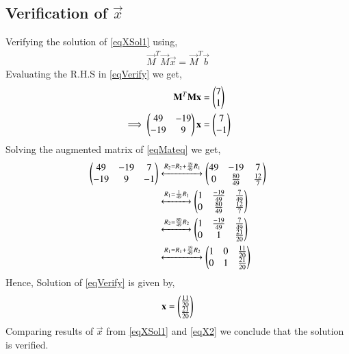 \documentclass[journal,12pt,twocolumn]{IEEEtran}
\begin{document}
\subsection{Verification of $\vec{x}$}

Verifying the solution of \eqref{eqXSol1} using,
\begin{align}
\vec{M}^T\vec{M}\vec{x} = \vec{M}^T\vec{b}\label{eqVerify}
\end{align}
Evaluating the R.H.S in \eqref{eqVerify} we get,
\begin{align}
\mathbf{M}^T\mathbf{M}\mathbf{x} &= \begin{pmatrix}7\\\-1\end{pmatrix}\\
\implies\begin{pmatrix}49&-19\\-19&9\end{pmatrix}\mathbf{x} &= \begin{pmatrix}7\\-1\end{pmatrix}\label{eqMateq}
\end{align}
Solving the augmented matrix of \eqref{eqMateq} we get,
\begin{align}
\begin{pmatrix}49&-19&7\\-19&9&-1\end{pmatrix} &\xleftrightarrow{R_2=R_2+\frac{19}{49}R_1}\begin{pmatrix}49&-19&7\\0&\frac{80}{49}&\frac{12}{7}\end{pmatrix}\\
&\xleftrightarrow{R_1=\frac{1}{49}R_1}\begin{pmatrix}1&\frac{-19}{49}&\frac{7}{49}\\0&\frac{80}{49}&\frac{12}{7}\end{pmatrix}\\
&\xleftrightarrow{R_2=\frac{80}{49}R_2}\begin{pmatrix}1&\frac{-19}{49}&\frac{7}{49}\\0&1&\frac{21}{20}\end{pmatrix}\\
&\xleftrightarrow{R_1=R_1+\frac{19}{49}R_2}\begin{pmatrix}1&0&\frac{11}{20}\\0&1&\frac{21}{20}\end{pmatrix}
\end{align}
Hence, Solution of \eqref{eqVerify} is given by,
\begin{align}
\mathbf{x}=\begin{pmatrix}\frac{11}{20}\\\frac{21}{20}\end{pmatrix}\label{eqX2}
\end{align}
Comparing results of $\vec{x}$ from \eqref{eqXSol1} and \eqref{eqX2} we conclude that the solution is verified.
\end{document}
